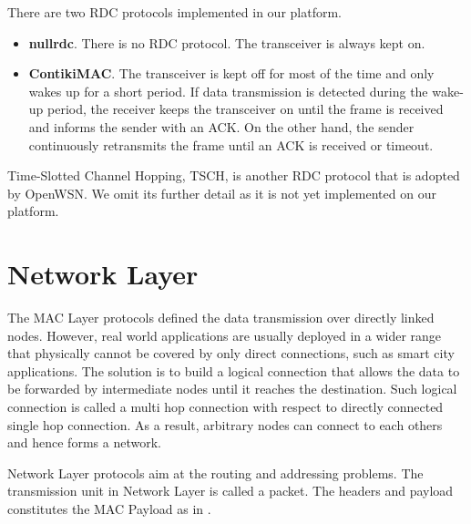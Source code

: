 There are two RDC protocols implemented in our platform.

\begin{itemize}
\item \textbf{nullrdc}. There is no RDC protocol. The transceiver is always kept on.
\item \textbf{ContikiMAC\cite{ContikiMAC}}. The transceiver is kept off for most of the time and only wakes up for a short period. If data transmission is detected during the wake-up period, the receiver keeps the transceiver on until the frame is received and informs the sender with an ACK. On the other hand, the sender continuously retransmits the frame until an ACK is received or timeout.
\end{itemize}

Time-Slotted Channel Hopping\cite{TSCH}, TSCH, is another RDC protocol that is adopted by OpenWSN. We omit its further detail as it is not yet implemented on our platform.

\section{Network Layer}
The MAC Layer protocols defined the data transmission over directly linked nodes. However, real world applications are usually deployed in a wider range that physically cannot be covered by only direct connections, such as smart city applications. The solution is to build a logical connection that allows the data to be forwarded by intermediate nodes until it reaches the destination. Such logical connection is called a multi hop connection with respect to directly connected single hop connection. As a result, arbitrary nodes can connect to each others and hence forms a network.

Network Layer protocols aim at the routing and addressing problems. The transmission unit in Network Layer is called a packet. The headers and payload constitutes the MAC Payload as in .

